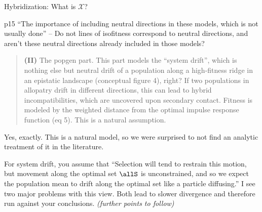 \reply{
}


\begin{point}{Hybridization:}
    What is $\mathcal{X}$?
\end{point}


\begin{point}{p15}
    ``The importance of including neutral directions in these models, which
    is not usually done'' -- Do not lines of isofitness correspond to neutral
    directions, and aren't these neutral directions already included in those models?
\end{point}




\begin{quote}
    \textbf{(II)} The popgen part. This part models the ``system drift'', which is nothing else
but neutral drift of a population along a high-fitness ridge in an epistatic
landscape (conceptual figure 4), right? If two populations in allopatry drift
in different directions, this can lead to hybrid incompatibilities, which are
uncovered upon secondary contact. Fitness is modeled by the weighted distance
from the optimal impulse response function (eq 5). This is a natural
assumption.
\end{quote}

Yes, exactly. This is a natural model,
so we were surprised to not find an analytic treatment of it
in the literature.

\begin{point}{}
    For system drift, you assume that ``Selection will tend to restrain this
motion, but movement along the optimal set $\allS$ is unconstrained, and so we expect
the population mean to drift along the optimal set like a particle diffusing.''
I see two major problems with this view. Both lead to slower divergence and
therefore run against your conclusions.
    \textit{(further points to follow)}
\end{point}

\reply{
}

